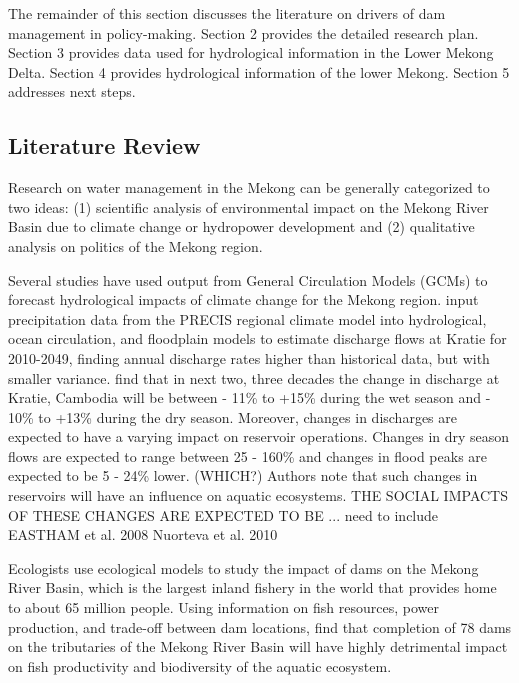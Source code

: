 \documentclass[11pt,english]{article}
\theoremstyle{plain} \newtheorem{claim}{Claim}
\theoremstyle{plain} \newtheorem{prop}{Proposition}
\theoremstyle{plain} \newtheorem{hypo}{Hypothesis}
\begin{document}
	The remainder of this section discusses the literature on drivers of dam management in policy-making. Section 2 provides the detailed research plan. Section 3 provides data used for hydrological information in the Lower Mekong Delta. Section 4 provides hydrological information of the lower Mekong. Section 5 addresses next steps. 

\subsection{Literature Review}

Research on water management in the Mekong can be generally categorized to two ideas: (1) scientific analysis of environmental impact on the Mekong River Basin due to climate change or hydropower development and (2) qualitative analysis on politics of the Mekong region. 



Several studies have used output from General Circulation Models (GCMs) to forecast hydrological impacts of climate change for the Mekong region. \citet{Vastila:2010bz} input precipitation data from the PRECIS regional climate model into hydrological, ocean circulation, and floodplain models to estimate discharge flows at Kratie for 2010-2049, finding annual discharge rates higher than historical data, but with smaller variance.  \citet{Lauri2012HESSD} find that in next two, three decades the change in discharge at Kratie, Cambodia will be between - 11\% to +15\% during the wet season and  - 10\% to +13\% during the dry season. Moreover, changes in discharges are expected to have a varying impact on reservoir operations. Changes in dry season flows are expected to range between 25 - 160\% and changes in flood peaks are expected to be 5 - 24\% lower. (WHICH?) Authors note that such changes in reservoirs will have an influence on aquatic ecosystems.     THE SOCIAL IMPACTS OF THESE CHANGES ARE EXPECTED TO BE ...   need to include EASTHAM et al. 2008   Nuorteva et al. 2010 

Ecologists use ecological models to study the impact of dams on the Mekong River Basin, which is the largest inland fishery in the world that provides home to about 65 million people.  Using information on fish resources, power production,  and trade-off between dam locations, \citet{ZivPNAS2012} find that completion of 78 dams on the tributaries of the Mekong River Basin will have highly detrimental impact on fish productivity and biodiversity of the aquatic ecosystem. 
\end{document}
